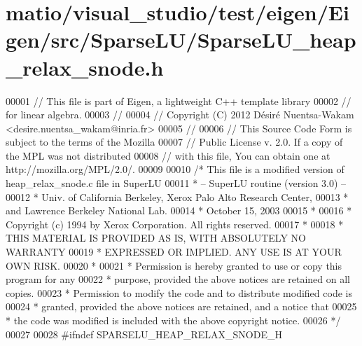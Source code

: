 \hypertarget{matio_2visual__studio_2test_2eigen_2_eigen_2src_2_sparse_l_u_2_sparse_l_u__heap__relax__snode_8h_source}{}\section{matio/visual\+\_\+studio/test/eigen/\+Eigen/src/\+Sparse\+L\+U/\+Sparse\+L\+U\+\_\+heap\+\_\+relax\+\_\+snode.h}
\label{matio_2visual__studio_2test_2eigen_2_eigen_2src_2_sparse_l_u_2_sparse_l_u__heap__relax__snode_8h_source}

\begin{DoxyCode}
00001 \textcolor{comment}{// This file is part of Eigen, a lightweight C++ template library}
00002 \textcolor{comment}{// for linear algebra.}
00003 \textcolor{comment}{//}
00004 \textcolor{comment}{// Copyright (C) 2012 Désiré Nuentsa-Wakam <desire.nuentsa\_wakam@inria.fr>}
00005 \textcolor{comment}{//}
00006 \textcolor{comment}{// This Source Code Form is subject to the terms of the Mozilla}
00007 \textcolor{comment}{// Public License v. 2.0. If a copy of the MPL was not distributed}
00008 \textcolor{comment}{// with this file, You can obtain one at http://mozilla.org/MPL/2.0/.}
00009 
00010 \textcolor{comment}{/* This file is a modified version of heap\_relax\_snode.c file in SuperLU}
00011 \textcolor{comment}{ * -- SuperLU routine (version 3.0) --}
00012 \textcolor{comment}{ * Univ. of California Berkeley, Xerox Palo Alto Research Center,}
00013 \textcolor{comment}{ * and Lawrence Berkeley National Lab.}
00014 \textcolor{comment}{ * October 15, 2003}
00015 \textcolor{comment}{ *}
00016 \textcolor{comment}{ * Copyright (c) 1994 by Xerox Corporation.  All rights reserved.}
00017 \textcolor{comment}{ *}
00018 \textcolor{comment}{ * THIS MATERIAL IS PROVIDED AS IS, WITH ABSOLUTELY NO WARRANTY}
00019 \textcolor{comment}{ * EXPRESSED OR IMPLIED.  ANY USE IS AT YOUR OWN RISK.}
00020 \textcolor{comment}{ *}
00021 \textcolor{comment}{ * Permission is hereby granted to use or copy this program for any}
00022 \textcolor{comment}{ * purpose, provided the above notices are retained on all copies.}
00023 \textcolor{comment}{ * Permission to modify the code and to distribute modified code is}
00024 \textcolor{comment}{ * granted, provided the above notices are retained, and a notice that}
00025 \textcolor{comment}{ * the code was modified is included with the above copyright notice.}
00026 \textcolor{comment}{ */}
00027 
00028 \textcolor{preprocessor}{#ifndef SPARSELU\_HEAP\_RELAX\_SNODE\_H}

\end{DoxyCode}
